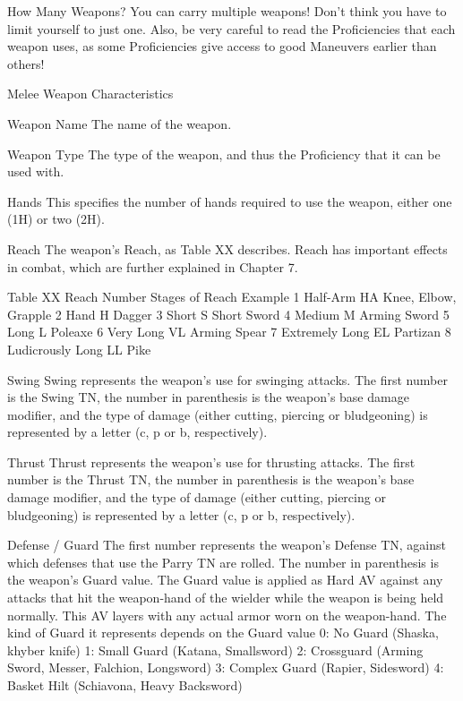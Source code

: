 \documentclass[oneside,11pt,english]{book}
\begin{document}
 


How Many Weapons? 
You can carry multiple weapons! Don’t think you have to limit yourself to just one. Also, be very careful 
to read the Proficiencies that each weapon uses, as some Proficiencies give access to good Maneuvers 
earlier than others! 

 

Melee Weapon Characteristics 

 

Weapon Name 
The name of the weapon. 

 

Weapon Type 
The type of the weapon, and thus the Proficiency that it can be used with. 

 

Hands 
This specifies the number of hands required to use the weapon, either one (1H) or two (2H). 

 

Reach 
The weapon’s Reach, as Table XX describes. Reach has important effects in combat, which are further 
explained in Chapter 7. 

 
Table XX Reach 
Number Stages of Reach Example 
1 Half-Arm HA Knee, Elbow, Grapple 
2 Hand H Dagger 
3 Short S Short Sword 
4 Medium M Arming Sword 
5 Long L Poleaxe 
6 Very Long VL Arming Spear 
7 Extremely Long EL Partizan 
8 Ludicrously Long LL Pike 

 

Swing 
Swing represents the weapon’s use for swinging attacks. The first number is the Swing TN, the number in 
parenthesis is the weapon’s base damage modifier, and the type of damage (either cutting, piercing or 
bludgeoning) is represented by a letter (c, p or b, respectively). 


 

Thrust 
Thrust represents the weapon’s use for thrusting attacks. The first number is the Thrust TN, the number in 
parenthesis is the weapon’s base damage modifier, and the type of damage (either cutting, piercing or 
bludgeoning) is represented by a letter (c, p or b, respectively). 

 

Defense / Guard 
The first number represents the weapon’s Defense TN, against which defenses that use the Parry TN are 
rolled. The number in parenthesis is the weapon’s Guard value. The Guard value is applied as Hard AV 
against any attacks that hit the weapon-hand of the wielder while the weapon is being held normally. This 
AV layers with any actual armor worn on the weapon-hand. The kind of Guard it represents depends on 
the Guard value 
0: No Guard (Shaska, khyber knife) 
1: Small Guard (Katana, Smallsword) 
2: Crossguard (Arming Sword, Messer, Falchion, Longsword) 
3: Complex Guard (Rapier, Sidesword) 
4: Basket Hilt (Schiavona, Heavy Backsword) 
\end{document}
